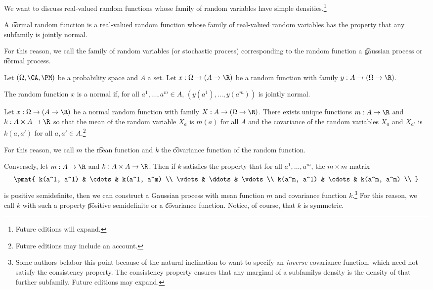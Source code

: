 

We want to discuss real-valued random functions whose family of random variables have simple densities.\footnote{Future editions will expand.}


A \t{normal random function} is a real-valued random function whose family of real-valued random variables has the property that any subfamily is jointly normal.

For this reason, we call the family of random variables (or stochastic process) corresponding to the random function a \t{gaussian process} or \t{normal process}.


Let $(\Omega, \CA, \PM)$ be a probability space and $A$ a set.
Let $x: \Omega \to (A \to \R)$ be a random function with family $y: A \to (\Omega \to \R)$.

The random function $x$ is a normal if, for all $a^1, \dots, a^m \in A$, $(y(a^1), \dots, y(a^m))$ is jointly normal.


\begin{proposition}
  Let $x: \Omega \to (A \to \R)$ be a normal random function with family $X: A \to (\Omega \to \R)$.
  There exists unique functions $m: A \to \R$ and $k: A \times A \to \R$ so that the mean of the random variable $X_a$ is $m(a)$ for all $A$ and the covariance of the random variables $X_a$ and $X_{a'}$ is $k(a, a')$ for all $a, a' \in A$.\footnote{Future editions may include an account.}
\end{proposition}
For this reason, we call $m$ the \t{mean function} and $k$ the \t{covariance function} of the random function.

Conversely, let $m: A \to \R$ and $k: A \times A \to \R$.
Then if $k$ satisfies the property that for all $a^1, \dots, a^m$, the $m \times m$ matrix
\[
  \pmat{
    k(a^1, a^1) & \cdots & k(a^1, a^m) \\
    \vdots & \ddots & \vdots \\
    k(a^m, a^1) & \cdots & k(a^m, a^m) \\
  }
\]
is positive semidefinite, then we can construct a Gaussian process with mean function $m$ and covariance function $k$.\footnote{Some authors belabor this point because of the natural inclination to want to specify an \textit{inverse} covariance function, which need not satisfy the consistency property.  The consistency property ensures that any marginal of a subfamilys density is the density of that further subfamily. Future editions may expand.}
For this reason, we call $k$ with such a property \t{positive semidefinite} or a \t{covariance function}.
Notice, of course, that $k$ is symmetric.

